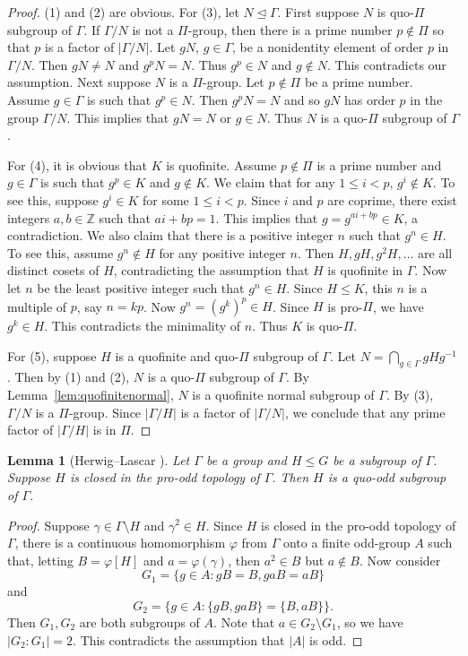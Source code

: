 \documentclass[10pt,a4paper]{amsart}
\newtheorem{lemma}[theorem]{Lemma}
\theoremstyle{definition}
\theoremstyle{definition}
\numberwithin{equation}{section}
\begin{document}
\begin{proof} (1) and (2) are obvious. For (3), let $N\unlhd\Gamma$. First suppose $N$ is quo-$\Pi$ subgroup of $\Gamma$. If $\Gamma/N$ is not a $\Pi$-group, then there is a prime number $p\not\in \Pi$ so that $p$ is a factor of $|\Gamma/N|$. Let $gN$, $g\in \Gamma$, be a nonidentity element of order $p$ in $\Gamma/N$. Then $gN\neq N$ and $g^pN=N$. Thus $g^p\in N$ and $g\not\in N$. This contradicts our assumption. Next suppose $N$ is a $\Pi$-group. Let $p\not\in \Pi$ be a prime number. Assume $g\in \Gamma$ is such that $g^p\in N$. Then $g^pN=N$ and so $gN$ has order $p$ in the group $\Gamma/N$. This implies that $gN=N$ or $g\in N$. Thus $N$ is a quo-$\Pi$ subgroup of $\Gamma$. 

For (4), it is obvious that $K$ is quofinite. Assume $p\not\in \Pi$ is a prime number and $g\in \Gamma$ is such that $g^p\in K$ and $g\not\in K$. We claim that for any $1\leq i<p$, $g^i\not\in K$. To see this, suppose $g^i\in K$ for some $1\leq i<p$. Since $i$ and $p$ are coprime, there exist integers $a, b\in \mathbb{Z}$ such that $ai+bp=1$. This implies that $g=g^{ai+bp}\in K$, a contradiction. We also claim that there is a positive integer $n$ such that $g^n\in H$. To see this, assume $g^n\not\in H$ for any positive integer $n$. Then $H, gH, g^2H, \dots$ are all distinct cosets of $H$, contradicting the assumption that $H$ is quofinite in $\Gamma$. Now let $n$ be the least positive integer such that $g^n\in H$. Since $H\leq K$, this $n$ is a multiple of $p$, say $n=kp$. Now  $g^n=(g^k)^p\in H$. Since $H$ is pro-$\Pi$, we have $g^k\in H$. This contradicts the minimality of $n$. Thus $K$ is quo-$\Pi$.


For (5), suppose $H$ is a quofinite and quo-$\Pi$ subgroup of $\Gamma$. Let $N=\bigcap_{g\in \Gamma}gHg^{-1}$. Then by (1) and (2), $N$ is a quo-$\Pi$ subgroup of $\Gamma$. By Lemma~\ref{lem:quofinitenormal}, $N$ is a quofinite normal subgroup of $\Gamma$. By (3), $\Gamma/N$ is a $\Pi$-group. Since $|\Gamma/H|$ is a factor of $|\Gamma/N|$, we conclude that any prime factor of $|\Gamma/H|$ is in $\Pi$.
\end{proof}


\begin{lemma}[Herwig--Lascar \cite{HL00}] Let $\Gamma$ be a group and $H\leq G$ be a subgroup of $\Gamma$. Suppose $H$ is closed in the pro-odd topology of $\Gamma$. Then $H$ is a quo-odd subgroup of $\Gamma$.
\end{lemma}

\begin{proof} Suppose $\gamma\in \Gamma\setminus H$ and $\gamma^2\in H$. Since $H$ is closed in the pro-odd topology of $\Gamma$, there is a continuous homomorphism $\varphi$ from $\Gamma$ onto a finite odd-group $A$ such that, letting $B=\varphi[H]$ and $a=\varphi(\gamma)$, then $a^2\in B$ but $a\not\in B$. Now consider
$$ G_1=\{g\in A\colon gB=B, gaB=aB\} $$
and
$$ G_2=\{g\in A\colon \{gB, gaB\}=\{B, aB\}\}. $$
Then $G_1, G_2$ are both subgroups of $A$. Note that $a\in G_2\setminus G_1$, so we have $|G_2\colon G_1|=2$. This contradicts the assumption that $|A|$ is odd.
\end{proof}
\end{document}
